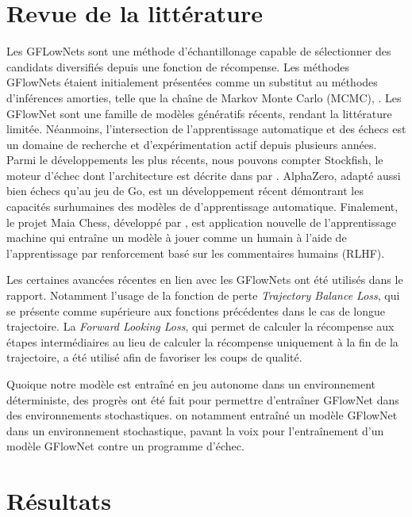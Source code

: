\documentclass[11pt]{article}
\begin{document}
\section*{Revue de la littérature}
Les GFLowNets sont une méthode d’échantillonage capable de
sélectionner des candidats diversifiés depuis une fonction de
récompense. Les méthodes GFlowNets étaient initialement présentées
comme un substitut au méthodes d’inférences amorties, telle que la
chaîne de Markov Monte Carlo (MCMC), \cite{gflownetfoundation}. Les
GFlowNet sont une famille de modèles génératifs récents, rendant la
littérature limitée. Néanmoins, l'intersection de l'apprentissage
automatique et des échecs est un domaine de recherche et
d'expérimentation actif depuis plusieurs années. Parmi le
développements les plus récents, nous pouvons compter Stockfish, le
moteur d'échec dont l'architecture est décrite dans par
\citet{stockfish}. AlphaZero, adapté aussi bien échecs qu'au jeu de
Go, est un développement récent démontrant les capacités surhumaines
des modèles de d'apprentissage automatique. Finalement, le projet Maia
Chess, développé par \citet{maia}, est application nouvelle de
l'apprentissage machine qui entraîne un modèle à jouer comme un humain
à l'aide de l'apprentissage par renforcement basé sur les commentaires
humains (RLHF).

Les certaines avancées récentes en lien avec les GFlowNets ont été
utilisés dans le rapport. Notamment l'usage de la fonction de perte
\textit{Trajectory Balance Loss}, qui se présente comme supérieure aux
fonctions précédentes dans le cas de longue trajectoire. La
\textit{Forward Looking Loss}, qui permet de calculer la récompense
aux étapes intermédiaires au lieu de calculer la récompense uniquement
à la fin de la trajectoire, a été utilisé afin de favoriser les coups
de qualité.

Quoique notre modèle est entraîné en jeu autonome dans un
environnement déterministe, des progrès ont été fait pour permettre
d'entraîner GFlowNet dans des environnements
stochastiques. \citet{stochasticflow} on notamment entraîné un modèle
GFlowNet dans un environnement stochastique, pavant la voix pour
l'entraînement d'un modèle GFlowNet contre un programme d'échec.

\section*{Résultats}
\end{document}
